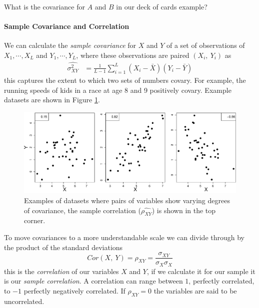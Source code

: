 \begin{question}
What is the covariance for $A$ and $B$ in our deck of cards example? 
\end{question}
  
\paragraph{Sample Covariance and Correlation} 
We can calculate the \emph{sample covariance} for $X$ and $Y$ of a set of observations
of $X_1, \cdots, X_L$ and $Y_1, \cdots, Y_L$, where these observations
are paired $(X_i,~Y_i)$ as
\begin{align}
 \widehat{\sigma_{XY}^2}  &= \frac{1}{L-1} \sum_{i=1}^L (X_i -
                            \bar{X}) (Y_i - \bar{Y})  %
\end{align}
this captures the extent to which two sets of numbers covary. For
example, the running speeds of kids in a race at age 8 and 9 positively
covary. Example datasets are shown in Figure \ref{Fig:Covar_egs}. 

    \begin{figure}
 \begin{center}
   \includegraphics[width=\textwidth]{math_background/dist_pics/Covar.pdf}\end{center}
 \caption{Examples of datasets where pairs of variables show varying
   degrees of covariance, the sample correlation ($ \widehat{\rho_{XY}}$) is shown in the top corner.
   }\label{Fig:Covar_egs}
 \end{figure}
To move covariances to a more understandable scale we can divide
through by the product of the standard deviations
\begin{equation}
Cor(X,~Y) =\rho_{XY} = \frac{{\sigma_{XY}}}{\sigma_{X} \sigma_{X}}  \label{eqn:def_corr}
\end{equation}
this is the \emph{correlation} of our variables $X$ and $Y$, if we
calculate it for our sample it is our \emph{sample correlation}. A correlation can range between $1$,
perfectly correlated, to $-1$ perfectly negatively correlated. If
$\rho_{XY} =0$ the variables are said to be uncorrelated.



